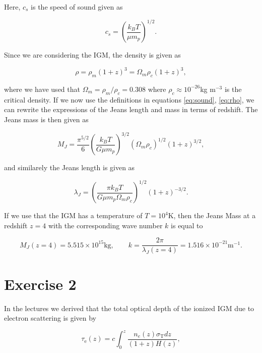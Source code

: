\documentclass[a4paper]{article}
\begin{document}
\noindent Here, $c_s$ is the speed of sound given as

\begin{equation}\label{eq:sound}
    c_s = \left( \frac{k_B T}{\mu m_p} \right)^{1/2}.
\end{equation}

\noindent Since we are considering the IGM, the density is given as

\begin{equation}\label{eq:rho}
    \rho = \rho_m(1+z)^3 = \Omega_m \rho_c (1+z)^3,
\end{equation}

\noindent where we have used that $\Omega_m = \rho_m / \rho_c = 0.308$ where $\rho_c \approx 10^{-26}$kg m$^{-3}$ is the critical density. If we now use the definitions in equations \eqref{eq:sound}, \eqref{eq:rho}, we can rewrite the expressions of the Jeans length and mass in terms of redshift. The Jeans mass is then given as

\begin{equation}\label{eq:jeanfinal}
    M_J = \frac{\pi^{5/2}}{6} \left( \frac{k_B T}{G \mu m_p} \right)^{3/2} (\Omega_m \rho_c)^{1/2} (1+z)^{3/2},
\end{equation}

\noindent and similarely the Jeans length is given as

\begin{equation}\label{eq:jeanlenfinal}
    \lambda_J = \left( \frac{\pi k_B T}{G \mu m_p \Omega_m \rho_c} \right)^{1/2} (1+z)^{-3/2}.
\end{equation}

\noindent If we use that the IGM has a temperature of $T = 10^4$K, then the Jeans Mass at a redshift $z = 4$ with the corresponding wave number $k$ is equal to 

\begin{equation}\label{eq:jeans z=4}
    M_J(z=4) = 5.515 \times 10^{15}\mathrm{kg}, \qquad k = \frac{2\pi}{\lambda_J(z = 4)} = 1.516 \times 10^{-21}\mathrm{m}^{-1}.
\end{equation}


\section*{Exercise 2}
In the lectures we derived that the total optical depth of the ionized IGM due to
electron scattering is given by

\begin{equation}\label{eq:tau}
    \tau _ { \mathrm { e } } ( z ) = c \int _ { 0 } ^ { z } \frac { n _ { e } ( z )
    \sigma _ { \mathrm { T } } d z } { ( 1 + z ) H ( z ) },
\end{equation}
\end{document}
